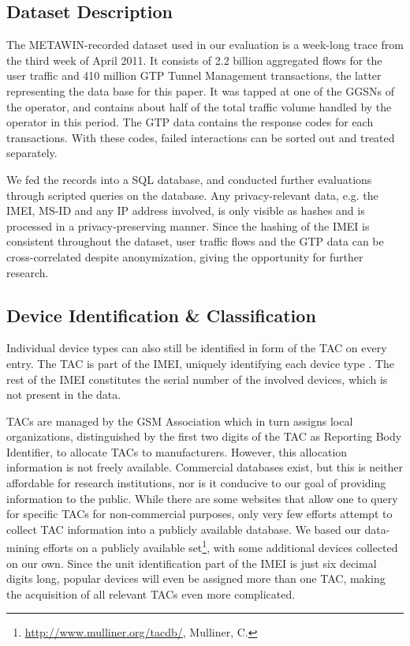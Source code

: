 \subsection{Dataset Description}


The \gls{METAWIN}-recorded dataset used in our evaluation is a week-long trace from the third week of April 2011. It consists of 2.2 billion aggregated flows for the user traffic and 410 million \gls{GTP} Tunnel Management transactions, the latter representing the data base for this paper. It was tapped at one of the \glspl{GGSN} of the operator, and contains about half of the total traffic volume handled by the operator in this period. The \gls{GTP} data contains the response codes for each transactions. With these codes, failed interactions can be sorted out and treated separately.

We fed the records into a SQL database, and conducted further evaluations through scripted queries on the database. Any privacy-relevant data, e.g. the \gls{IMEI}, \gls{MS-ID} and any IP address involved, is only visible as hashes and is processed in a privacy-preserving manner.  Since the hashing of the \gls{IMEI} is consistent throughout the dataset, user traffic flows and the \gls{GTP} data can be cross-correlated despite anonymization, giving the opportunity for further research.


\subsection{Device Identification \& Classification}

Individual device types can also still be identified in form of the \gls{TAC} on every entry. The \gls{TAC} is part of the \gls{IMEI}, uniquely identifying each device type \cite{3gpp23.003}. The rest of the \gls{IMEI} constitutes the serial number of the involved devices, which is not present in the data.

\glspl{TAC} are managed by the GSM Association which in turn assigns local organizations, distinguished by the first two digits of the \gls{TAC} as Reporting Body Identifier, to allocate \glspl{TAC} to manufacturers. However, this allocation information is not freely available. Commercial databases exist, but this is neither affordable for research institutions, nor is it conducive to our goal of providing information to the public. While there are some websites that allow one to query for specific \glspl{TAC} for non-commercial purposes, only very few efforts attempt to collect \gls{TAC} information into a publicly available database. We based our data-mining efforts on a publicly available set\footnote{\url{http://www.mulliner.org/tacdb/}, Mulliner, C.}, with some additional devices collected on our own. Since the unit identification part of the \gls{IMEI} is just six decimal digits long, popular devices will even be assigned more than one TAC, making the acquisition of all relevant \glspl{TAC} even more complicated.

